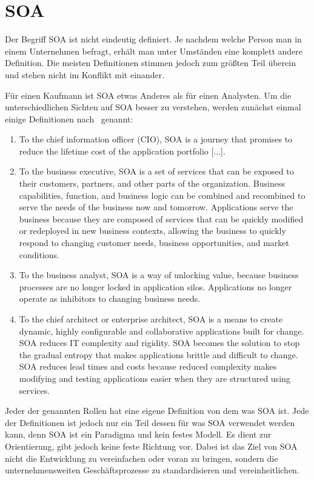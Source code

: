 \chapter{SOA}
\label{chap:soa}
Der Begriff SOA ist nicht eindeutig definiert. Je nachdem welche Person man in einem Unternehmen befragt, erhält man unter Umständen eine komplett andere Definition. \frqq Die meisten Definitionen stimmen jedoch zum größten Teil überein und stehen nicht im Konflikt mit einander.\flqq\ \ \cite[vgl. Seite 6]{100QA}

Für einen Kaufmann ist SOA etwas Anderes als für einen Analysten. Um die unterschiedlichen Sichten auf SOA besser zu verstehen, werden zunächst einmal einige Definitionen nach \cite{100QA}\ genannt:
\begin{enumerate}
       \item \frqq To the chief information officer (CIO), SOA is a journey that
       promises to reduce the lifetime cost of the application portfolio [...].\flqq\  \cite[vgl. Seite 6]{100QA}
    
       \item \frqq To the business executive, SOA is a set of services that can be exposed to their customers, partners, and other parts of the organization. Business capabilities, function, and business logic can be combined and recombined to serve the needs of the business now and tomorrow. Applications serve the business because they are composed
       of services that can be quickly modified or redeployed in new
       business contexts, allowing the business to quickly respond to changing
       customer needs, business opportunities, and market conditions.\flqq\  \cite[vgl. Seite 6]{100QA}
       
       \item \frqq To the business analyst, SOA is a way of unlocking value, because business processes are no longer locked in application silos. Applications no longer operate as inhibitors to changing business needs.\flqq\  \cite[vgl. Seite 6]{100QA}
       
       \item \frqq To the chief architect or enterprise architect, SOA is a means to
       create dynamic, highly configurable and collaborative applications
       built for change. SOA reduces IT complexity and rigidity. SOA becomes the solution to stop the gradual entropy that makes applications
       brittle and difficult to change. SOA reduces lead times and costs
       because reduced complexity makes modifying and testing applications
       easier when they are structured using services.\flqq\  \cite[vgl. Seite 6]{100QA}
\end{enumerate}
Jeder der genannten Rollen hat eine eigene Definition von dem was SOA ist. Jede der Definitionen ist jedoch nur ein Teil dessen für was SOA verwendet werden kann, denn SOA ist ein Paradigma und kein festes Modell. Es dient zur Orientierung, gibt jedoch keine feste Richtung vor. Dabei ist das Ziel von SOA nicht die Entwicklung zu vereinfachen oder voran zu bringen, sondern die unternehmensweiten Geschäftsprozesse zu standardisieren und vereinheitlichen.

